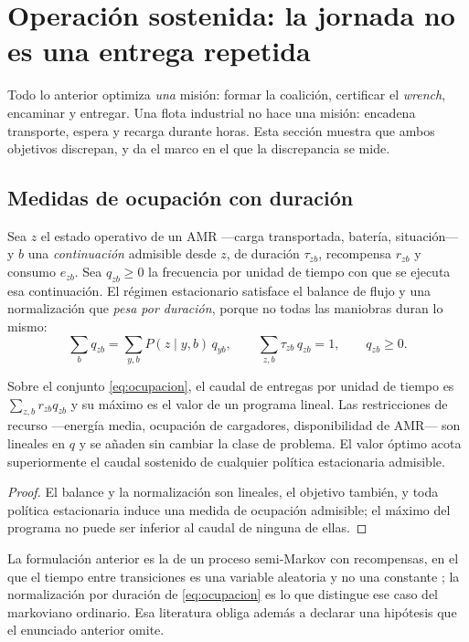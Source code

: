 \section{Operación sostenida: la jornada no es una entrega repetida}
\label{sec:operacion}

Todo lo anterior optimiza \emph{una} misión: formar la coalición, certificar el
\emph{wrench}, encaminar y entregar. Una flota industrial no hace una misión:
encadena transporte, espera y recarga durante horas. Esta sección muestra que
ambos objetivos discrepan, y da el marco en el que la discrepancia se mide.

\subsection{Medidas de ocupación con duración}

Sea $z$ el estado operativo de un AMR —carga transportada, batería, situación—
y $b$ una \emph{continuación} admisible desde $z$, de duración $\tau_{zb}$,
recompensa $r_{zb}$ y consumo $e_{zb}$. Sea $q_{zb}\ge0$ la frecuencia por
unidad de tiempo con que se ejecuta esa continuación. El régimen estacionario
satisface el balance de flujo y una normalización que \emph{pesa por duración},
porque no todas las maniobras duran lo mismo:
\begin{equation}
  \sum_b q_{zb}=\sum_{y,b}P(z\mid y,b)\,q_{yb},
  \qquad
  \sum_{z,b}\tau_{zb}\,q_{zb}=1,
  \qquad q_{zb}\ge0 .
  \label{eq:ocupacion}
\end{equation}

\begin{proposicion}
\label{pr:caudal}
Sobre el conjunto \eqref{eq:ocupacion}, el caudal de entregas por unidad de
tiempo es $\sum_{z,b}r_{zb}q_{zb}$ y su máximo es el valor de un programa
lineal. Las restricciones de recurso —energía media, ocupación de cargadores,
disponibilidad de AMR— son lineales en $q$ y se añaden sin cambiar la clase de
problema. El valor óptimo acota superiormente el caudal sostenido de cualquier
política estacionaria admisible.
\end{proposicion}

\begin{proof}
El balance y la normalización son lineales, el objetivo también, y toda política
estacionaria induce una medida de ocupación admisible; el máximo del programa no
puede ser inferior al caudal de ninguna de ellas.
\end{proof}

La formulación anterior es la de un proceso semi-Markov con recompensas, en el
que el tiempo entre transiciones es una variable aleatoria y no una constante
\cite{lozovanu2024positional}; la normalización por duración de
\eqref{eq:ocupacion} es lo que distingue ese caso del markoviano ordinario. Esa
literatura obliga además a declarar una hipótesis que el enunciado anterior
omite.

